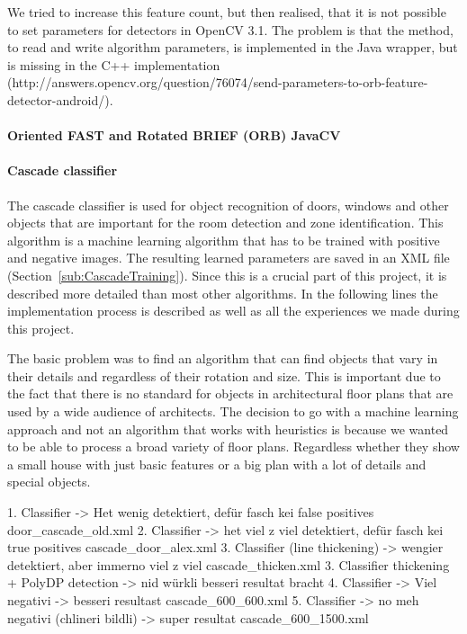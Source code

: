 We tried to increase this feature count, but then realised, that it is not possible to set parameters for detectors in OpenCV 3.1. The problem is that the method, to read and write algorithm parameters, is implemented in the Java wrapper, but is missing in the C++ implementation (http://answers.opencv.org/question/76074/send-parameters-to-orb-feature-detector-android/).

\paragraph{Oriented FAST and Rotated BRIEF (ORB) JavaCV}
\label{sub:ImpORBJVCV}


\paragraph{Cascade classifier}
\label{sub:ImpCascadeClassifier}
The cascade classifier is used for object recognition of doors, windows and other objects that are important for the room detection and zone identification. This algorithm is a machine learning algorithm that has to be trained with positive and negative images. The resulting learned parameters are saved in an XML file (Section~\ref{sub:CascadeTraining}). Since this is a crucial part of this project, it is described more detailed than most other algorithms. In the following lines the implementation process is described as well as all the experiences we made during this project.

The basic problem was to find an algorithm that can find objects that vary in their details and regardless of their rotation and size. This is important due to the fact that there is no standard for objects in architectural floor plans that are used by a wide audience of architects. The decision to go with a machine learning approach and not an algorithm that works with heuristics is because we wanted to be able to process a broad variety of floor plans. Regardless whether they show a small house with just basic features or a big plan with a lot of details and special objects.

1. Classifier -> Het wenig detektiert, defür fasch kei false positives door\_cascade\_old.xml
2. Classifier -> het viel z viel detektiert, defür fasch kei true positives cascade\_door\_alex.xml
3. Classifier (line thickening) -> wengier detektiert, aber immerno viel z viel cascade\_thicken.xml
3. Classifier thickening + PolyDP detection -> nid würkli besseri resultat bracht
4. Classifier -> Viel negativi -> besseri resultast cascade\_600\_600.xml
5. Classifier -> no meh negativi (chlineri bildli) -> super resultat cascade\_600\_1500.xml

